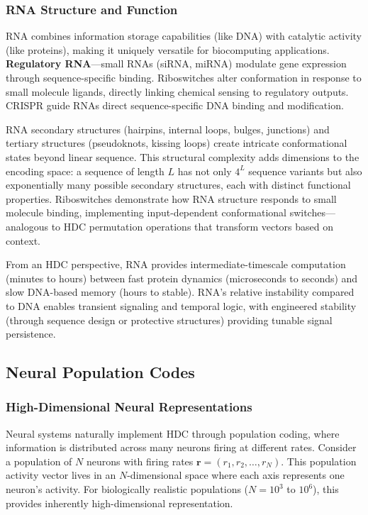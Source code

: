 \documentclass[12pt]{article}
\begin{document}
\subsubsection{RNA Structure and Function}

RNA combines information storage capabilities (like DNA) with catalytic activity (like proteins), making it uniquely versatile for biocomputing applications. \textbf{Regulatory RNA}—small RNAs (siRNA, miRNA) modulate gene expression through sequence-specific binding. Riboswitches alter conformation in response to small molecule ligands, directly linking chemical sensing to regulatory outputs. CRISPR guide RNAs direct sequence-specific DNA binding and modification.

RNA secondary structures (hairpins, internal loops, bulges, junctions) and tertiary structures (pseudoknots, kissing loops) create intricate conformational states beyond linear sequence. This structural complexity adds dimensions to the encoding space: a sequence of length $L$ has not only $4^L$ sequence variants but also exponentially many possible secondary structures, each with distinct functional properties. Riboswitches demonstrate how RNA structure responds to small molecule binding, implementing input-dependent conformational switches—analogous to HDC permutation operations that transform vectors based on context.

From an HDC perspective, RNA provides intermediate-timescale computation (minutes to hours) between fast protein dynamics (microseconds to seconds) and slow DNA-based memory (hours to stable). RNA's relative instability compared to DNA enables transient signaling and temporal logic, with engineered stability (through sequence design or protective structures) providing tunable signal persistence.

\subsection{Neural Population Codes}

\subsubsection{High-Dimensional Neural Representations}

Neural systems naturally implement HDC through population coding, where information is distributed across many neurons firing at different rates. Consider a population of $N$ neurons with firing rates $\mathbf{r} = (r_1, r_2, \ldots, r_N)$. This population activity vector lives in an $N$-dimensional space where each axis represents one neuron's activity. For biologically realistic populations ($N = 10^3$ to $10^6$), this provides inherently high-dimensional representation.
\end{document}
